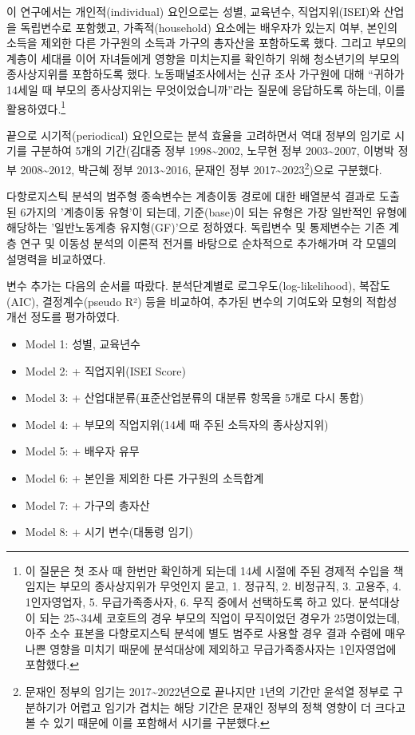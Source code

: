 \documentclass[
  letterpaper,
  DIV=11,
  numbers=noendperiod]{scrartcl}
\providecommand{\tightlist}{%
  \setlength{\itemsep}{0pt}\setlength{\parskip}{0pt}}\usepackage{longtable,booktabs,array}
\begin{document}
이 연구에서는 개인적(individual) 요인으로는 성별, 교육년수,
직업지위(ISEI)와 산업을 독립변수로 포함했고, 가족적(household) 요소에는
배우자가 있는지 여부, 본인의 소득을 제외한 다른 가구원의 소득과 가구의
총자산을 포함하도록 했다. 그리고 부모의 계층이 세대를 이어 자녀들에게
영향을 미치는지를 확인하기 위해 청소년기의 부모의 종사상지위를
포함하도록 했다. 노동패널조사에서는 신규 조사 가구원에 대해 ``귀하가
14세일 때 부모의 종사상지위는 무엇이었습니까''라는 질문에 응답하도록
하는데, 이를 활용하였다.\footnote{이 질문은 첫 조사 때 한번만 확인하게
  되는데 14세 시절에 주된 경제적 수입을 책임지는 부모의 종사상지위가
  무엇인지 묻고, 1. 정규직, 2. 비정규직, 3. 고용주, 4. 1인자영업자, 5.
  무급가족종사자, 6. 무직 중에서 선택하도록 하고 있다. 분석대상이 되는
  25\textasciitilde34세 코호트의 경우 부모의 직업이 무직이었던 경우가
  25명이었는데, 아주 소수 표본을 다항로지스틱 분석에 별도 범주로 사용할
  경우 결과 수렴에 매우 나쁜 영향을 미치기 때문에 분석대상에 제외하고
  무급가족종사자는 1인자영업에 포함했다.}

끝으로 시기적(periodical) 요인으로는 분석 효율을 고려하면서 역대 정부의
임기로 시기를 구분하여 5개의 기간(김대중 정부 1998\textasciitilde2002,
노무현 정부 2003\textasciitilde2007, 이병박 정부
2008\textasciitilde2012, 박근혜 정부 2013\textasciitilde2016, 문재인
정부 2017\textasciitilde2023\footnote{문재인 정부의 임기는
  2017\textasciitilde2022년으로 끝나지만 1년의 기간만 윤석열 정부로
  구분하기가 어렵고 임기가 겹치는 해당 기간은 문재인 정부의 정책 영향이
  더 크다고 볼 수 있기 때문에 이를 포함해서 시기를 구분했다.})으로
구분했다.

다항로지스틱 분석의 범주형 종속변수는 계층이동 경로에 대한 배열분석
결과로 도출된 6가지의 '계층이동 유형'이 되는데, 기준(base)이 되는 유형은
가장 일반적인 유형에 해당하는 '일반노동계층 유지형(GF)'으로 정하였다.
독립변수 및 통제변수는 기존 계층 연구 및 이동성 분석의 이론적 전거를
바탕으로 순차적으로 추가해가며 각 모델의 설명력을 비교하였다.

변수 추가는 다음의 순서를 따랐다. 분석단계별로 로그우도(log-likelihood),
복잡도(AIC), 결정계수(pseudo R²) 등을 비교하여, 추가된 변수의 기여도와
모형의 적합성 개선 정도를 평가하였다.

\begin{itemize}
\tightlist
\item
  Model 1: 성별, 교육년수
\item
  Model 2: + 직업지위(ISEI Score)
\item
  Model 3: + 산업대분류(표준산업분류의 대분류 항목을 5개로 다시 통합)
\item
  Model 4: + 부모의 직업지위(14세 때 주된 소득자의 종사상지위)
\item
  Model 5: + 배우자 유무
\item
  Model 6: + 본인을 제외한 다른 가구원의 소득합계
\item
  Model 7: + 가구의 총자산
\item
  Model 8: + 시기 변수(대통령 임기)
\end{itemize}
\end{document}
